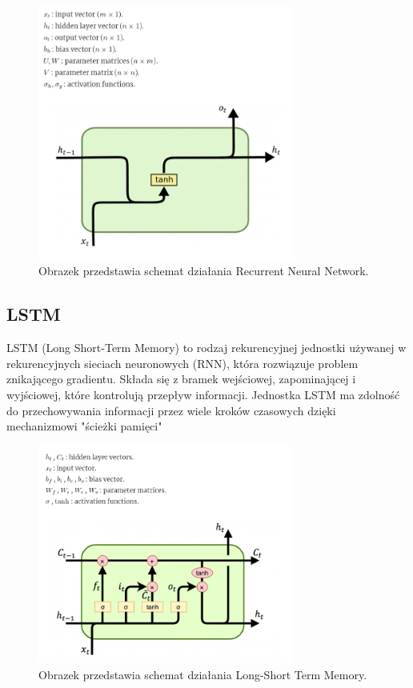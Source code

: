 \documentclass{article}
\begin{document}
    \begin{figure}[h]
        \centering
        \includegraphics[width=0.75\textwidth]{images/rnn.png}
        \caption{Obrazek przedstawia schemat działania Recurrent Neural Network.}
        \label{fig:mesh1}
    \end{figure}
    \pagebreak
    \subsection{LSTM}
    LSTM (Long Short-Term Memory) to rodzaj rekurencyjnej jednostki używanej w rekurencyjnych sieciach neuronowych (RNN), która rozwiązuje problem znikającego gradientu. Składa się z bramek wejściowej, zapominającej i wyjściowej, które kontrolują przepływ informacji. Jednostka LSTM ma zdolność do przechowywania informacji przez wiele kroków czasowych dzięki mechanizmowi "ścieżki pamięci"
    \begin{figure}[h]
        \centering
        \includegraphics[width=0.75\textwidth]{images/lstm.png}
        \caption{Obrazek przedstawia schemat działania Long-Short Term Memory.}
        \label{fig:mesh1}
    \end{figure}
    \pagebreak
\end{document}
